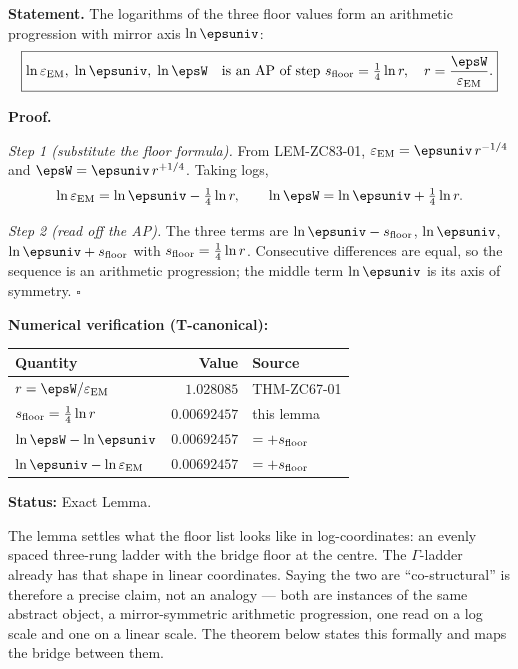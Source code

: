 \documentclass[12pt, a4paper]{article}
\renewcommand{\epsEM}{\varepsilon_{\rm EM}}     %
\begin{document}
\begin{formalbox}[title={LEM-ZC88-01: The Log Floor Lattice is an
  Arithmetic Progression ($R_0$, Exact)}]

\textbf{Statement.}
The logarithms of the three floor values form an arithmetic progression
with mirror axis $\ln\epsuniv$:
\begin{equation}
  \boxed{
    \ln\epsEM,\;\ln\epsuniv,\;\ln\epsW
    \quad\text{is an AP of step }s_{\rm floor}=\tfrac14\ln r,
    \quad r=\frac{\epsW}{\epsEM}.
  }
  \label{eq:lem-main-zc88}
\end{equation}

\textbf{Proof.}

\textit{Step 1 (substitute the floor formula).}
From LEM-ZC83-01, $\epsEM=\epsuniv\,r^{-1/4}$ and
$\epsW=\epsuniv\,r^{+1/4}$. Taking logs,
\[
  \ln\epsEM=\ln\epsuniv-\tfrac14\ln r,\qquad
  \ln\epsW =\ln\epsuniv+\tfrac14\ln r.
\]

\textit{Step 2 (read off the AP).}
The three terms are $\ln\epsuniv-s_{\rm floor}$, $\ln\epsuniv$,
$\ln\epsuniv+s_{\rm floor}$ with $s_{\rm floor}=\tfrac14\ln r$. Consecutive
differences are equal, so the sequence is an arithmetic progression; the
middle term $\ln\epsuniv$ is its axis of symmetry.
\hfill$\square$

\textbf{Numerical verification (T-canonical):}
\begin{center}
{\small\renewcommand{\arraystretch}{1.25}
\begin{tabular}{@{}lrl@{}}
\toprule
Quantity & Value & Source \\
\midrule
$r=\epsW/\epsEM$            & $1.028085$    & THM-ZC67-01 \\
$s_{\rm floor}=\tfrac14\ln r$ & $0.00692457$ & this lemma \\
$\ln\epsW-\ln\epsuniv$     & $0.00692457$  & $=+s_{\rm floor}$ \\
$\ln\epsuniv-\ln\epsEM$    & $0.00692457$  & $=+s_{\rm floor}$ \\
\bottomrule
\end{tabular}}
\end{center}

\textbf{Status:} Exact Lemma.
\end{formalbox}


The lemma settles what the floor list looks like in log-coordinates: an
evenly spaced three-rung ladder with the bridge floor at the centre. The
$\Gamma$-ladder already has that shape in linear coordinates. Saying the two
are ``co-structural'' is therefore a precise claim, not an analogy --- both
are instances of the same abstract object, a mirror-symmetric arithmetic
progression, one read on a log scale and one on a linear scale. The theorem
below states this formally and maps the bridge between them.
\end{document}
